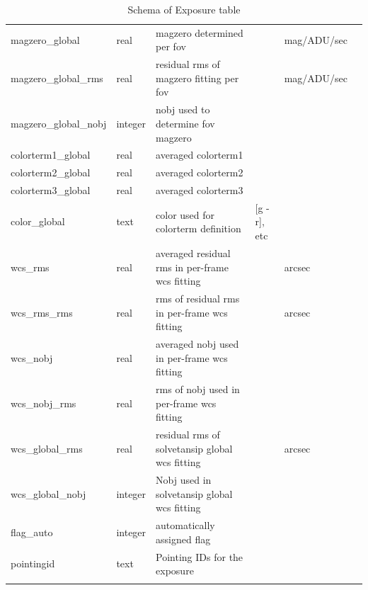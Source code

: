 \documentclass[12pt]{article}
\begin{document}
\begin{table}[thbp]
\begin{center}
{\begin{tabular}{llllll}
magzero\_global & real & magzero determined per fov                               &                           & mag/ADU/sec      &             \\
magzero\_global\_rms & real & residual rms of magzero fitting per fov                  &                           & mag/ADU/sec      &             \\
magzero\_global\_nobj & integer & nobj used to determine fov magzero                       &                           &                  &             \\
colorterm1\_global & real & averaged colorterm1                                      &                           &                  &             \\
colorterm2\_global & real & averaged colorterm2                                      &                           &                  &             \\
colorterm3\_global & real & averaged colorterm3                                      &                           &                  &             \\
color\_global & text & color used for colorterm definition                      & [g - r], etc               &                  &             \\
wcs\_rms & real & averaged residual rms in per-frame wcs fitting           &                           & arcsec           &             \\
wcs\_rms\_rms & real & rms of residual rms in per-frame wcs fitting             &                           & arcsec           &             \\
wcs\_nobj & real & averaged nobj used in per-frame wcs fitting              &                           &                  &             \\
wcs\_nobj\_rms & real & rms of nobj used in per-frame wcs fitting                &                           &                  &             \\
wcs\_global\_rms & real & residual rms of solvetansip global wcs fitting           &                           & arcsec           &             \\
wcs\_global\_nobj & integer & Nobj used in solvetansip global wcs fitting              &                           &                  &             \\
flag\_auto & integer & automatically assigned flag                              &                           &                  &             \\
pointingid & text & Pointing IDs for the exposure                            &                           &                  &             \\
\hline\\
\end{tabular}
}
\caption{Schema of Exposure table}
\end{center}
\end{table}
\end{document}
